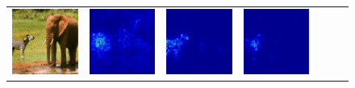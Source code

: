 \setlength{\tabcolsep}{0.5pt}
\begin{figure}
\begin{center}
\begin{tabular}{ccccccc}
\vspace{-2.5pt}
\includegraphics[width=0.14\linewidth,height=0.115\linewidth]{figs/examples/googlenet/soft/zeb-ele1} &
\includegraphics[width=0.14\linewidth,height=0.115\linewidth]{figs/examples/alexnet/soft/zeb-ele1_sali_341} &
\includegraphics[width=0.14\linewidth,height=0.115\linewidth]{figs/examples/vggnet/soft/zeb-ele1_sali_341} &
\includegraphics[width=0.14\linewidth,height=0.115\linewidth]{figs/examples/googlenet/soft/zeb-ele1_sali_341} &

\end{tabular}
\end{center}
\end{figure}
